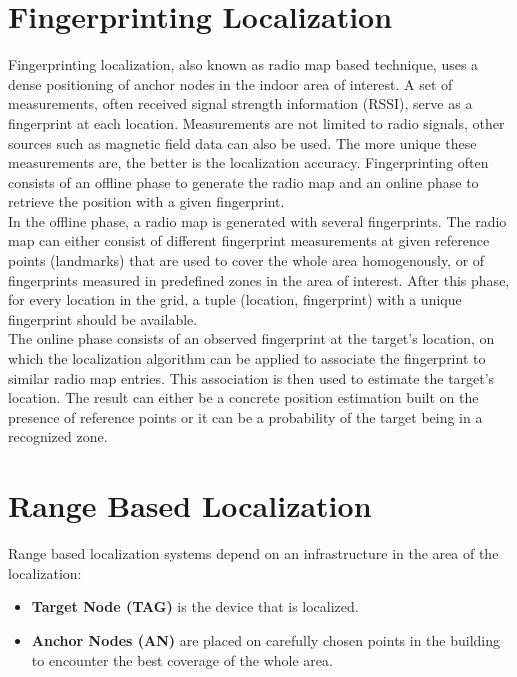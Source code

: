\section{Fingerprinting Localization}
Fingerprinting localization, also known as radio map based technique, uses a dense positioning of anchor nodes in the indoor area of interest. A set of measurements, often received signal strength information (RSSI), serve as a fingerprint at each location. Measurements are not limited to radio signals, other sources such as magnetic field data can also be used. The more unique these measurements are, the better is the localization accuracy. Fingerprinting often consists of an offline phase to generate the radio map and an online phase to retrieve the position with a given fingerprint.\\
\noindent\hspace*{5mm}%
In the offline phase, a radio map is generated with several fingerprints. The radio map can either consist of different fingerprint measurements at given reference points (landmarks) that are used to cover the whole area homogenously, or of fingerprints measured in predefined zones in the area of interest. After this phase, for every location in the grid, a tuple (location, fingerprint) with a unique fingerprint should be available.\\
\noindent\hspace*{5mm}%
The online phase consists of an observed fingerprint at the target's location, on which the localization algorithm can be applied to associate the fingerprint to similar radio map entries. This association is then used to estimate the target's location. The result can either be a concrete position estimation built on the presence of reference points or it can be a probability of the target being in a recognized zone. 


\section{Range Based Localization}

Range based localization systems depend on an infrastructure in the area of the localization:
\begin{itemize} 
\item \textbf{Target Node (TAG)} is the device that is localized. 
\item \textbf{Anchor Nodes (AN)} are placed on carefully chosen points in the building to encounter the best coverage of the whole area.
\end{itemize}

